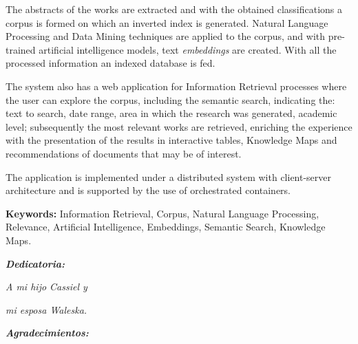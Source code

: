 The abstracts of the works are extracted and with the obtained classifications a corpus is formed on which an inverted index is generated. Natural Language Processing and Data Mining techniques are applied to the corpus, and with pre-trained artificial intelligence models, text \textit{embeddings} are created. With all the processed information an indexed database is fed.

The system also has a web application for Information Retrieval processes where the user can explore the corpus, including the semantic search, indicating the: text to search, date range, area in which the research was generated, academic level; subsequently the most relevant works are retrieved, enriching the experience with the presentation of the results in interactive tables, Knowledge Maps and recommendations of documents that may be of interest.

The application is implemented under a distributed system with client-server architecture and is supported by the use of orchestrated containers.

\vspace*{2cm}

\textbf{Keywords:} Information Retrieval, Corpus, Natural Language Processing, Relevance,  Artificial Intelligence, Embeddings, Semantic Search, Knowledge Maps.

\thispagestyle{empty}




\setlength{\abovedisplayskip}{-5pt}
\setlength{\abovedisplayshortskip}{-5pt}
\thispagestyle{empty}

\newpage
\begin{center}
\large{\textbf{\emph{\Huge{Dedicatoria:}}}}
\end{center}
\thispagestyle{empty}
\vspace*{5cm}
\thispagestyle{empty}
\begin{center} \Large \emph{A  mi hijo Cassiel y  } \end{center}
\vspace*{1cm}
\begin{center} \Large \emph{mi esposa Waleska.} \end{center}



\newpage
\begin{center}
\large{\textbf{\emph{\Huge{Agradecimientos:}}}}
\end{center}
\thispagestyle{empty}
\vspace*{2cm}
\thispagestyle{empty}

